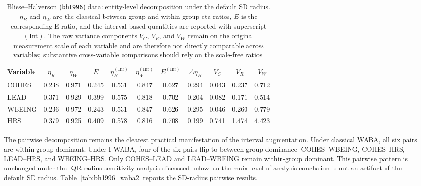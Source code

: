\documentclass[preprint, times, 12pt, authoryear]{elsarticle}
\begin{document}
\begin{table}[ht]
	\centering
	\caption{Bliese--Halverson (\texttt{bh1996}) data: entity-level decomposition under the default SD radius. $\eta_B$ and $\eta_W$ are the classical between-group and within-group eta ratios, $E$ is the corresponding E-ratio, and the interval-based quantities are reported with superscript \((\mathrm{Int})\). The raw variance components $V_C$, $V_R$, and $V_W$ remain on the original measurement scale of each variable and are therefore not directly comparable across variables; substantive cross-variable comparisons should rely on the scale-free ratios.}
	\label{tab:bh1996_waba1}
	\begin{tabular}{lcccccccccc}
		\toprule
		Variable & $\eta_B$ & $\eta_W$ & $E$ & $\eta_B^{(\mathrm{Int})}$ & $\eta_W^{(\mathrm{Int})}$ & $E^{(\mathrm{Int})}$ & $\Delta\eta_B$ & $V_C$ & $V_R$ & $V_W$ \\
		\midrule
		COHES  & 0.238 & 0.971 & 0.245 & 0.531 & 0.847 & 0.627 & 0.294 & 0.043 & 0.237 & 0.712 \\
		LEAD   & 0.371 & 0.929 & 0.399 & 0.575 & 0.818 & 0.702 & 0.204 & 0.082 & 0.171 & 0.514 \\
		WBEING & 0.236 & 0.972 & 0.243 & 0.531 & 0.847 & 0.626 & 0.295 & 0.046 & 0.260 & 0.779 \\
		HRS    & 0.379 & 0.925 & 0.409 & 0.578 & 0.816 & 0.708 & 0.199 & 0.741 & 1.474 & 4.423 \\
		\bottomrule
	\end{tabular}
\end{table}

The pairwise decomposition remains the clearest practical manifestation of the interval augmentation. Under classical WABA, all six pairs are within-group dominant. Under I-WABA, four of the six pairs flip to between-group dominance: COHES--WBEING, COHES--HRS, LEAD--HRS, and WBEING--HRS. Only COHES--LEAD and LEAD--WBEING remain within-group dominant. This pairwise pattern is unchanged under the IQR-radius sensitivity analysis discussed below, so the main level-of-analysis conclusion is not an artifact of the default SD radius. Table~\ref{tab:bh1996_waba2} reports the SD-radius pairwise results.
\end{document}
